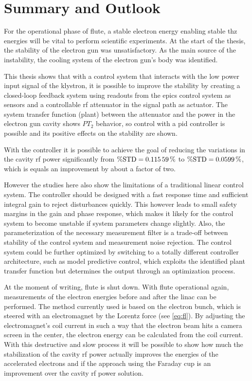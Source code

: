 \chapter{Summary and Outlook}
For the operational phase of \gls{flute}, a stable electron energy enabling stable \gls{thz} energies will be vital to perform scientific experiments. At the start of the thesis, the stability of the electron gun was unsatisfactory. As the main source of the instability, the cooling system of the electron gun's body was identified.

This thesis shows that with a control system that interacts with the low power input signal of the klystron, it is possible to improve the stability by creating a closed-loop feedback system using readouts from the \gls{epics} control system as sensors and a controllable \gls{rf} attenuator in the signal path as actuator. The system transfer function (plant) between the attenuator and the power in the electron gun cavity shows $PT_2$ behavior, so control with a \gls{pid} controller is possible and its positive effects on the stability are shown.

With the controller it is possible to achieve the goal of reducing the variations in the cavity \gls{rf} power significantly from $\operatorname{\%STD}=\SI{0.11559}{\percent}$ to $\operatorname{\%STD}=\SI{0.0599}{\percent}$, which is equals an improvement by about a factor of two.

However the studies here also show the limitations of a traditional linear control system. The controller should be designed with a fast response time and sufficient integral gain to reject disturbances quickly. This however leads to small safety margins in the gain and phase response, which makes it likely for the control system to become unstable if system parameters change slightly. Also, the parameterization of the necessary measurement filter is a trade-off between stability of the control system and measurement noise rejection. The control system could be further optimized by switching to a totally different controller architecture, such as model predictive control, which exploits the identified plant transfer function but determines the output through an optimization process.

At the moment of writing, \gls{flute} is shut down. With \gls{flute} operational again, measurements of the electron energies before and after the \gls{linac} can be performed. The method currently used is based on the electron bunch, which is steered with an electromagnet by the Lorentz force (see \autoref{eq:fl}). By adjusting the electromagnet's coil current in such a way that the electron beam hits a camera screen in the center, the electron energy can be calculated from the coil current. With this destructive and slow process it will be possible to show how much the stabilization of the cavity \gls{rf} power actually improves the energies of the accelerated electrons and if the approach using the Faraday cup is an improvement over the cavity \gls{rf} power solution.

